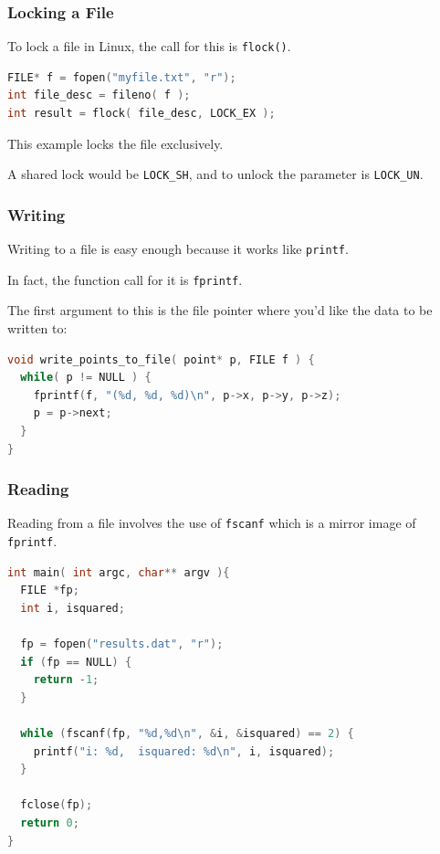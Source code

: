 \begin{frame}[fragile]
	\frametitle{Locking a File}
	To lock a file in Linux, the call for this is \texttt{flock()}.

	\begin{lstlisting}[language=C]
FILE* f = fopen("myfile.txt", "r");
int file_desc = fileno( f );
int result = flock( file_desc, LOCK_EX );
\end{lstlisting}

	This example locks the file exclusively.

	A shared lock would be \texttt{LOCK\_SH}, and to unlock the parameter is \texttt{LOCK\_UN}.

\end{frame}


\begin{frame}[fragile]
	\frametitle{Writing}

	Writing to a file is easy enough because it works like \texttt{printf}.

	In fact, the function call for it is \texttt{fprintf}.

	The first argument to this is the file pointer where you'd like the data to be written to:

	\begin{lstlisting}[language=C]
void write_points_to_file( point* p, FILE f ) {
  while( p != NULL ) {
    fprintf(f, "(%d, %d, %d)\n", p->x, p->y, p->z);
    p = p->next;
  }
}
\end{lstlisting}
\end{frame}


\begin{frame}[fragile]
	\frametitle{Reading}

	Reading from a file involves the use of \texttt{fscanf} which is a mirror image of \texttt{fprintf}.


	\begin{lstlisting}[language=C]
int main( int argc, char** argv ){
  FILE *fp;
  int i, isquared;
   
  fp = fopen("results.dat", "r");
  if (fp == NULL) {
    return -1;
  }
   
  while (fscanf(fp, "%d,%d\n", &i, &isquared) == 2) {
    printf("i: %d,  isquared: %d\n", i, isquared);
  }
  
  fclose(fp);
  return 0;
}
\end{lstlisting}

\end{frame}



